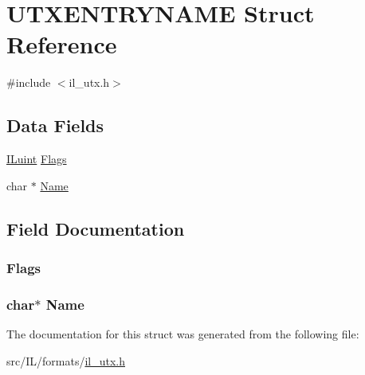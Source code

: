 \hypertarget{struct_u_t_x_e_n_t_r_y_n_a_m_e}{\section{U\-T\-X\-E\-N\-T\-R\-Y\-N\-A\-M\-E Struct Reference}
\label{struct_u_t_x_e_n_t_r_y_n_a_m_e}
}


{\ttfamily \#include $<$il\-\_\-utx.\-h$>$}

\subsection*{Data Fields}
\begin{DoxyCompactItemize}
\item 
\hyperlink{il_8h_ac6508d0e9c19e32f32e00d54b5b8cf30}{I\-Luint} \hyperlink{struct_u_t_x_e_n_t_r_y_n_a_m_e_ad5c4db01d6ffdff05862b7052afa79fc}{Flags}
\item 
char $\ast$ \hyperlink{struct_u_t_x_e_n_t_r_y_n_a_m_e_a5e6182c030324511dd82e9fa1a0ab071}{Name}
\end{DoxyCompactItemize}


\subsection{Field Documentation}
\hypertarget{struct_u_t_x_e_n_t_r_y_n_a_m_e_ad5c4db01d6ffdff05862b7052afa79fc}{
\subsubsection[{Flags}]{ Flags}}\label{struct_u_t_x_e_n_t_r_y_n_a_m_e_ad5c4db01d6ffdff05862b7052afa79fc}
\hypertarget{struct_u_t_x_e_n_t_r_y_n_a_m_e_a5e6182c030324511dd82e9fa1a0ab071}{
\subsubsection[{Name}]{\setlength{\rightskip}{0pt plus 5cm}char$\ast$ Name}}\label{struct_u_t_x_e_n_t_r_y_n_a_m_e_a5e6182c030324511dd82e9fa1a0ab071}


The documentation for this struct was generated from the following file\-:\begin{DoxyCompactItemize}
\item 
src/\-I\-L/formats/\hyperlink{il__utx_8h}{il\-\_\-utx.\-h}\end{DoxyCompactItemize}

